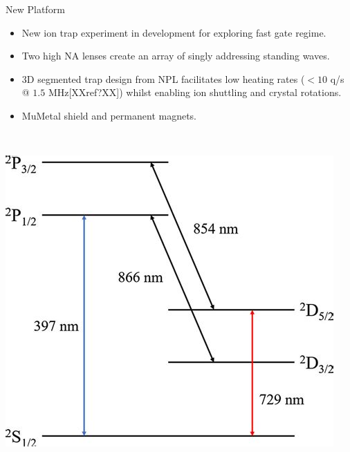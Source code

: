 \documentclass[final]{beamer}
\begin{document}
\begin{frame}{}
\begin{center}
\begin{columns}[t]
\begin{column}{0.49\textwidth}
    \begin{alertblock}{New Platform}
      \begin{minipage}{0.58\textwidth}
      \begin{itemize}
      \item New ion trap experiment in development for exploring fast
        gate regime.
      \item Two high NA lenses create an array of singly
        addressing standing waves.
      \item 3D segmented trap design from NPL facilitates low heating
        rates ($<10$ q/s @ $1.5$ MHz[XXref?XX]) whilst enabling ion shuttling and crystal rotations.
      \item MuMetal shield and permanent magnets.
      \end{itemize}
      \end{minipage}
      ~~
      \begin{minipage}{0.35\textwidth}
      \includegraphics[width=0.94\textwidth]{./figs/ca_struct_tmp.jpeg}
      \end{minipage}


\end{alertblock}
\end{column}
\end{columns}
\end{center}
\end{frame}
\end{document}
